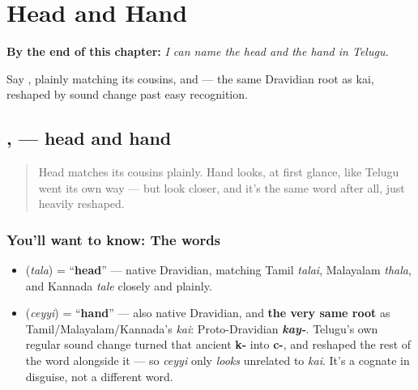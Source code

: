 
\chapter{Head and Hand}
\label{ch:te-head-and-hand}

\begin{chapteropening}
\textbf{By the end of this chapter:} \emph{I can name the head and the hand in Telugu.}

Say , plainly matching its cousins, and  — the same Dravidian root as kai, reshaped by sound change past easy recognition.
\end{chapteropening}

\section[\texorpdfstring{\te{తల} \te{చెయ్యి} (tala ceyyi)}{తల చెయ్యి (tala ceyyi)}]{,  — head and hand}

\label{lesson:TE-C13-sharira-bhagalu}



\begin{quote}
Head matches its cousins plainly. Hand looks, at first glance, like Telugu went its own way — but look closer, and it's the same word after all, just heavily reshaped.
\end{quote}

\subsection*{You'll want to know: The words}
\begin{itemize}
\raggedright
  \item \textbf{} (\emph{tala}) = \textquotedblleft{}\textbf{head}\textquotedblright{} — native Dravidian, matching Tamil \emph{talai}, Malayalam \emph{thala}, and Kannada \emph{tale} closely and plainly.
  \item \textbf{} (\emph{ceyyi}) = \textquotedblleft{}\textbf{hand}\textquotedblright{} — also native Dravidian, and \textbf{the very same root} as Tamil/Malayalam/Kannada's \emph{kai}: Proto-Dravidian \emph{\textbf{kay-}}. Telugu's own regular sound change turned that ancient \textbf{k-} into \textbf{c-}, and reshaped the rest of the word alongside it — so \emph{ceyyi} only \emph{looks} unrelated to \emph{kai}. It's a cognate in disguise, not a different word.
\end{itemize}

